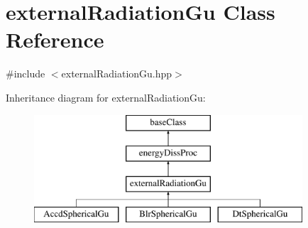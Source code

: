\hypertarget{classexternalRadiationGu}{\section{external\-Radiation\-Gu Class Reference}
\label{classexternalRadiationGu}
}


{\ttfamily \#include $<$external\-Radiation\-Gu.\-hpp$>$}

Inheritance diagram for external\-Radiation\-Gu\-:\begin{figure}[H]
\begin{center}
\leavevmode
\includegraphics[height=4.000000cm]{classexternalRadiationGu}
\end{center}
\end{figure}


